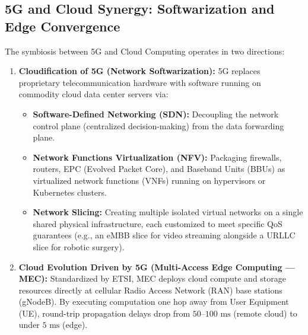 \documentclass[11pt,a4paper,openany]{report}
\begin{document}
\subsection{5G and Cloud Synergy: Softwarization and Edge Convergence}
The symbiosis between 5G and Cloud Computing operates in two directions:
\begin{enumerate}[leftmargin=*]
  \item \textbf{Cloudification of 5G (Network Softwarization):} 5G replaces proprietary telecommunication hardware with software running on commodity cloud data center servers via:
    \begin{itemize}
      \item \textbf{Software-Defined Networking (SDN):} Decoupling the network control plane (centralized decision-making) from the data forwarding plane.
      \item \textbf{Network Functions Virtualization (NFV):} Packaging firewalls, routers, EPC (Evolved Packet Core), and Baseband Units (BBUs) as virtualized network functions (VNFs) running on hypervisors or Kubernetes clusters.
      \item \textbf{Network Slicing:} Creating multiple isolated virtual networks on a single shared physical infrastructure, each customized to meet specific QoS guarantees (e.g., an eMBB slice for video streaming alongside a URLLC slice for robotic surgery).
    \end{itemize}
  \item \textbf{Cloud Evolution Driven by 5G (Multi-Access Edge Computing --- MEC):} Standardized by ETSI, MEC deploys cloud compute and storage resources directly at cellular Radio Access Network (RAN) base stations (gNodeB). By executing computation one hop away from User Equipment (UE), round-trip propagation delays drop from $50\text{--}100\text{ ms}$ (remote cloud) to under $5\text{ ms}$ (edge).
\end{enumerate}
\end{document}
